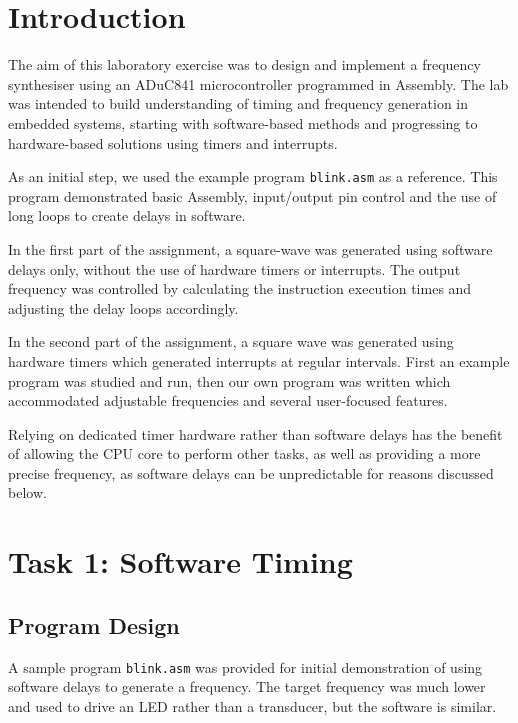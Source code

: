 \documentclass[11pt]{article}
\begin{document}



\section{Introduction}

The aim of this laboratory exercise was to design and implement a frequency synthesiser using an ADuC841 microcontroller programmed in Assembly. The lab was intended to build understanding of timing and frequency generation in embedded systems, starting with software-based methods and progressing to hardware-based solutions using timers and interrupts. 

As an initial step, we used the example program \texttt{blink.asm} as a reference. This program demonstrated basic Assembly, input/output pin control and the use of long loops to create delays in software.

In the first part of the assignment, a square-wave was generated using software delays only, without the use of hardware timers or interrupts. The output frequency was controlled by calculating the instruction execution times and adjusting the delay loops accordingly.

In the second part of the assignment, a square wave was generated using hardware timers which generated interrupts at regular intervals. First an example program was studied and run, then our own program was written which accommodated adjustable frequencies and several user-focused features.

Relying on dedicated timer hardware rather than software delays has the benefit of allowing the CPU core to perform other tasks, as well as providing a more precise frequency, as software delays can be unpredictable for reasons discussed below.

\section{Task 1: Software Timing}

\subsection{Program Design}

A sample program \texttt{blink.asm} was provided for initial demonstration of using software delays to generate a frequency. The target frequency was much lower and used to drive an LED rather than a transducer, but the software is similar.
\end{document}

